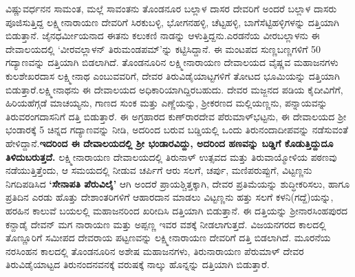 ವಿಷ್ಣುವರ್ಧನನ ಸಾಮಂತ, ಮಲ್ಲೆ ಸಾವಂತನು ತೊಂಡನೂರ ಬಲ್ಲಾಳ ದಾಸರ ದೇವರಿಗೆ ಅಂದರೆ ಬಲ್ಲಾಳ ದಾಸರು ಪೂಜಿಸುತ್ತಿದ್ದ ಲಕ್ಷ್ಮೀನಾರಾಯಣ ದೇವರಿಗೆ ಸಿರಕುಬಳ್ಳಿ, ಭೋಗನಹಳ್ಳಿ, ಚೆಟ್ಟಹಳ್ಳಿ, ಬಾಗೆಸೆಟ್ಟಿಹಳ್ಳಿಗಳನ್ನು ದತ್ತಿಯಾಗಿ ಬಿಡುತ್ತಾನೆ. ಜೈನಧರ್ಮೀಯನಾದ ಈತನು ಕಲುಕಣಿ ನಾಡನ್ನು ಆಳುತ್ತಿದ್ದನು.ಎರಡನೆಯ ವೀರಬಲ್ಲಾಳನು ಈ ದೇವಾಲಯದಲ್ಲಿ ‘ವೀರವಲ್ಲಾಳನ್​ ತಿರುಮಂಡಪಮ್’ನ್ನು ಕಟ್ಟಿಸಿದ್ದಾನೆ. ಈ ಮಂಟಪದ ಸುಣ್ಣಬಣ್ಣಗಳಿಗೆ 50 ಗದ್ಯಾಣವನ್ನು ದತ್ತಿಯಾಗಿ ಬಿಡಲಾಗಿದೆ. ತೊಂಡನೂರಿನ ಲಕ್ಷ್ಮೀನಾರಾಯಣ ದೇವಾಲಯದ ವೈಷ್ಣವ ಮಹಾಜನಗಳು ಕುಲಶೇಖರದಾಸ ಲಕ್ಷ್ಮೀನಾಥ ಎಂಬುವವರಿಗೆ, ದೇವರ ತಿರುವಿಡೈಯಾಟ್ಟಗಳಿಗೆ ತೋಟದ ಭೂಮಿಯನ್ನು ದತ್ತಿಯಾಗಿ ಬಿಡುತ್ತಾರೆ.\break ಲಕ್ಷ್ಮೀನಾಥನು ಈ ದೇವಾಲಯದ ಅಧಿಕಾರಿಯಾಗಿದ್ದಿರಬಹುದು. ದೇವರ ಮಜ್ಜನದ ಪಡಿಯ ಕೈದೀವಿಗೆಗೆ, ಹಿರಿಯಹೆಗ್ಗಡೆ ಮಾಚಯ್ಯನು, ಗಾಣದ ಸುಂಕ ಮತ್ತು ಎಣ್ಣೆಯನ್ನು, ಶ‍್ರೀಕರಣದ ಮಲ್ಲಿಯಣ್ಣನು, ಪನ್ನಾಯವನ್ನು ತಿರುವರಂಗದಾಸನಿಗೆ ದತ್ತಿ ಬಿಡುತ್ತಾರೆ. ಈ ಅಗ್ರಹಾರದ ಕುಣ್​ರಾರದೇವ ಪೆರುಮಾಳ್​ಭಟ್ಟನು, ಈ ದೇವಾಲಯದ ಶ‍್ರೀ ಭಂಡಾರಕ್ಕೆ 5 ಚಿನ್ನದ ಗದ್ಯಾಣವನ್ನು ನೀಡಿ, ಅದರಿಂದ ಬರುವ ಬಡ್ಡಿಯಲ್ಲಿ ಒಂದು ತಿರುನಂದಾದೀಪವನ್ನು ನಡೆಸುವಂತೆ ಹೇಳಿದ್ದಾನೆ.\textbf{ಇದರಿಂದ ಈ ದೇವಾಲಯದಲ್ಲಿ ಶ‍್ರೀ ಭಂಡಾರವಿದ್ದು, ಅದರಿಂದ ಹಣವನ್ನು ಬಡ್ಡಿಗೆ ಕೊಡುತ್ತಿದ್ದುದೂ ತಿಳಿದುಬರುತ್ತದೆ.} ಲಕ್ಷ್ಮೀನಾರಾಯಣ ದೇವಾಲಯದಲ್ಲಿ ತಿರುನಾಳ್​ ಉತ್ಸವದ ಮತ್ತು ತಿರುವಾಯ್ಮೋಳಿಯ ಪಠಣವು ನಡೆಯುತ್ತಿತ್ತೆಂದು, ಆ ಸಮಯದಲ್ಲಿ ನೀಡುವ ಚರ್ಪಿಗೆ ಆರು ಸಲಗೆ, ಚರ್ಪು, ಮಣಿಪರುಪ್ಪುಗೆ, ವಿಟ್ಟಣ್ಣನು ನಿಗದಿಪಡಿಸಿದ \textbf{‘ಸೇನಾಪತಿ ಪೆರುವಿಲೈ’} ಆಗಿ ಅಂದರೆ ಪ್ರಾಯಶ್ಚಿತ್ತಕ್ಕಾಗಿ, ದೇವರ ಪ್ರತಿಮೆಯನ್ನು ಶುದ್ಧೀಕರಿಸಲು, ಹಾಗೂ ಪ್ರತಿದಿನ ಎರಡು ಹೊತ್ತು ದೇಶಾಂತರಿಗಳಿಗೆ ಆಹಾರದಾನ ಮಾಡಲು ವಿಟ್ಟಣ್ಣನು ಹತ್ತು ಸಲಗೆ ಕಳನಿ(ಗದ್ದೆ)ಯನ್ನು, ಹರಹಿನ ಕಾಲುವೆ ಬಯಲಲ್ಲಿ ಮಹಾಜನರಿಂದ ಖರೀದಿಸಿ ದತ್ತಿಯಾಗಿ ಬಿಡುತ್ತಾನೆ. ಈ ದತ್ತಿಯನ್ನು ಶ‍್ರೀನಾರಸಿಂಹಪುರದ ಕನ್ದಾಡೈ ದೇವನ್​ ಮಗ ನಾರಾಯಣ ಮತ್ತು ಅಪ್ಪಣ್ಣ ಇವರ ವಶಕ್ಕೆ ನೀಡಲಾಗುತ್ತದೆ. ವಿಜಯನಗರದ ಕಾಲದಲ್ಲಿ ತೊಣ್ಣೂರಿಗೆ ಸಮೀಪದ ದೇವರಾಯ ಪಟ್ಟಣವನ್ನು ಲಕ್ಷ್ಮೀನಾರಾಯಣ ದೇವರಿಗೆ ದತ್ತಿ ಬಿಡ\-ಲಾಗಿದೆ. ಮೂರನೆಯ ನರಸಿಂಹನ ಕಾಲದಲ್ಲಿ ತೊಂಡನೂರಿನ ಅಶೇಷ ಮಹಾಜನಗಳು, ತಿರುನಾರಾಯಣ ಪೆರುಮಾಳ್​ ದೇವರ ತಿರುವಿಡೈಯಾಟ್ಟದ ತಿರುನಂದನವನಕ್ಕೆ ವರುಷಕ್ಕೆ ನಾಲ್ಕು ಹೊನ್ನನ್ನು ದತ್ತಿಯಾಗಿ ಬಿಡುತ್ತಾರೆ.

